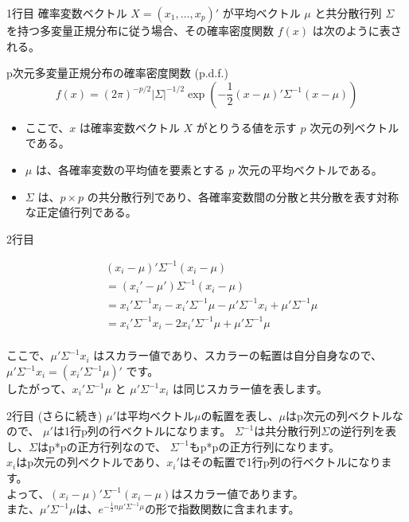 \documentclass[aspectratio=169]{beamer}
\begin{document}
\begin{frame}{1行目}
確率変数ベクトル $X = (x_1, \dots, x_p)'$ が平均ベクトル $\mu$ と共分散行列 $\Sigma$ を持つ多変量正規分布に従う場合、その確率密度関数 $f(x)$ は次のように表される。
\begin{block}{p次元多変量正規分布の確率密度関数 (p.d.f.)}
\begin{equation*}
f(x) = (2\pi)^{-p/2} |\Sigma|^{-1/2} \exp\left(-\frac{1}{2}(x - \mu)'\Sigma^{-1}(x - \mu)\right)
\end{equation*}
\end{block}
\begin{itemize}
\item ここで、$x$ は確率変数ベクトル $X$ がとりうる値を示す $p$ 次元の列ベクトルである。
\item $\mu$ は、各確率変数の平均値を要素とする $p$ 次元の平均ベクトルである。
\item $\Sigma$ は、$p \times p$ の共分散行列であり、各確率変数間の分散と共分散を表す対称な正定値行列である。
\end{itemize}
\end{frame}

\begin{frame}{2行目} %

\begin{align*}
&(x_i - \mu)'\Sigma^{-1}(x_i - \mu) \\
&= (x_i' - \mu')\Sigma^{-1}(x_i - \mu) \\
&= x_i'\Sigma^{-1}x_i - x_i'\Sigma^{-1}\mu - \mu'\Sigma^{-1}x_i + \mu'\Sigma^{-1}\mu \\
&= x_i'\Sigma^{-1}x_i - 2x_i'\Sigma^{-1}\mu + \mu'\Sigma^{-1}\mu \\
\end{align*}

ここで、$\mu'\Sigma^{-1}x_i$ はスカラー値であり、スカラーの転置は自分自身なので、$\mu'\Sigma^{-1}x_i = (x_i'\Sigma^{-1}\mu)'$ です。\\
したがって、$x_i'\Sigma^{-1}\mu$ と $\mu'\Sigma^{-1}x_i$ は同じスカラー値を表します。

\end{frame}

\begin{frame}{2行目 (さらに続き)} %
$\mu'$は平均ベクトル$\mu$の転置を表し、$\mu$はp次元の列ベクトルなので、
$\mu'$は1行p列の行ベクトルになります。
$\Sigma^{-1}$は共分散行列$\Sigma$の逆行列を表し、$\Sigma$はp*pの正方行列なので、
$\Sigma^{-1}$もp*pの正方行列になります。\\

$x_i$はp次元の列ベクトルであり、$x_i'$はその転置で1行p列の行ベクトルになります。\\[1em]

よって、$(x_i - \mu)' \Sigma^{-1} (x_i - \mu)$はスカラー値であります。\\[0.5em]
また、$\mu'\Sigma^{-1}\mu\text{は、}e^{-\frac{1}{2}n\mu'\Sigma^{-1}\mu}$の形で指数関数に含まれます。
\end{frame}
\end{document}
